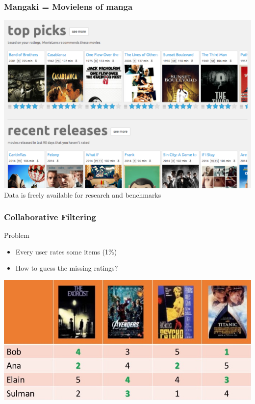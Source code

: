 \documentclass[]{beamer}
\begin{document}
\begin{frame}
  \frametitle{Mangaki = Movielens of manga}
  \centering
  \includegraphics[width=\textwidth]{figures/movielens.png}\\
  Data is freely available for research and benchmarks
\end{frame}

\begin{frame}
	\frametitle{Collaborative Filtering}
	\begin{block}{Problem}
		\begin{itemize}
		\item Every user rates some items (1\%)
    \item How to guess the missing ratings?
		\end{itemize}
    \vspace{-2mm}
	\end{block}
  \includegraphics[width=\linewidth]{figures/cf.jpg}
\end{frame}
\end{document}
